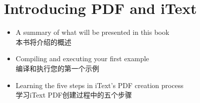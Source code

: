 \documentclass{book}
\begin{document}

\chapter{Introducing PDF and iText}


\begin{tcolorbox}[opacityframe=0.0,colback=sumBgColor,colupper=sumTxtColor,grow to left by=2em,before upper={\textbf{This chapter covers\\本章涵盖了}},width=\textwidth]
\begin{itemize}
    \item  A summary of what will be presented in this book\\本书将介绍的概述

    \item  Compiling and executing your first example\\编译和执行您的第一个示例
    
    \item  Learning the five steps in iText’s PDF creation process\\学习iText PDF创建过程中的五个步骤
\end{itemize}
\end{tcolorbox}
\end{document}
